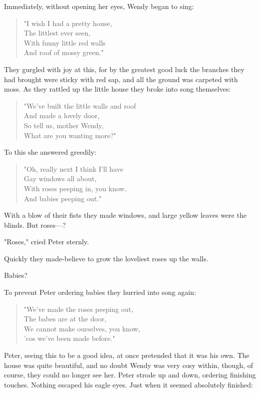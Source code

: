 Immediately, without opening her eyes, Wendy began to sing:

\begin{verse}
	"I wish I had a pretty house,\\
	The littlest ever seen,\\
	With funny little red walls\\
	And roof of mossy green."
\end{verse}

They gurgled with joy at this, for by the greatest good luck the branches they had brought were sticky with red sap, and all the ground was carpeted with moss.
As they rattled up the little house they broke into song themselves:

\begin{verse}
	"We've built the little walls and roof\\
	And made a lovely door,\\
	So tell us, mother Wendy,\\
	What are you wanting more?"
\end{verse}

To this she answered greedily:

\begin{verse}
	"Oh, really next I think I'll have\\
	Gay windows all about,\\
	With roses peeping in, you know,\\
	And babies peeping out."
\end{verse}

With a blow of their fists they made windows, and large yellow leaves were the blinds.
But roses—?

"Roses," cried Peter sternly.

Quickly they made-believe to grow the loveliest roses up the walls.

Babies?

To prevent Peter ordering babies they hurried into song again:

\begin{verse}
	"We've made the roses peeping out,\\
	The babes are at the door,\\
	We cannot make ourselves, you know,\\
	'cos we've been made before."
\end{verse}

Peter, seeing this to be a good idea, at once pretended that it was his own.
The house was quite beautiful, and no doubt Wendy was very cosy within, though, of course, they could no longer see her.
Peter strode up and down, ordering finishing touches.
Nothing escaped his eagle eyes.
Just when it seemed absolutely finished:

